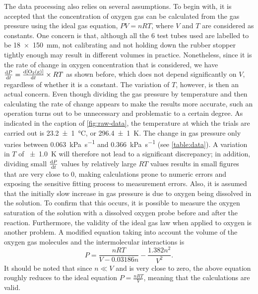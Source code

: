 \documentclass[a4paper, 12pt]{article}
\begin{document}
The data processing also relies on several assumptions. To begin with, it is accepted that the concentration of oxygen gas can be calculated from the gas pressure using the ideal gas equation, $P V = n R T$, where $V$ and $T$ are considered as constants. One concern is that, although all the $6$ test tubes used are labelled to be \SI{18x150}{\mm}, not calibrating and not holding down the rubber stopper tightly enough may result in different volumes in practice. Nonetheless, since it is the rate of change in oxygen concentration that is considered, we have $\dv{P}{t} = \dv{\ce{[O2(g)]}}{t} \times RT$ as shown before, which does not depend significantly on $V$, regardless of whether it is a constant. The variation of $T$, however, is then an actual concern. Even though dividing the gas pressure by temperature and then calculating the rate of change appears to make the results more accurate, such an operation turns out to be unnecessary and problematic to a certain degree. As indicated in the caption of \cref{fig:raw-data}, the temperature at which the trials are carried out is \SI{23.2(10)}{\celsius}, or \SI{296.4(10)}{\kelvin}. The change in gas pressure only varies between \SI{0.063}{\kPa\per\second} and \SI{0.366}{\kPa\per\second} (see \cref{table:data}). A variation in $T$ of \SI{+-1.0}{\kelvin} will therefore not lead to a significant discrepancy; in addition, dividing small $\dv{P}{t}$ values by relatively large $RT$ values results in small figures that are very close to $0$, making calculations prone to numeric errors and exposing the sensitive fitting process to measurement errors. Also, it is assumed that the initially slow increase in gas pressure is due to oxygen being dissolved in the solution. To confirm that this occurs, it is possible to measure the oxygen saturation of the solution with a dissolved oxygen probe before and after the reaction. Furthermore, the validity of the ideal gas law when applied to oxygen is another problem. A modified equation taking into account the volume of the oxygen gas molecules and the intermolecular interactions is \cite{weast_1972} \[ P = \frac{nRT}{V - 0.03186n} - \frac{1.382n^2}{V^2} .\]
It should be noted that since $n \ll V$ and is very close to zero, the above equation roughly reduces to the ideal equation $P = \frac{nRT}{V}$, meaning that the calculations are valid.
\end{document}
